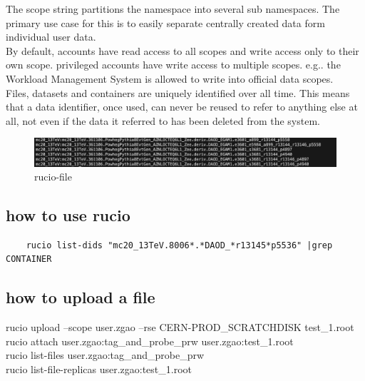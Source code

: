 \documentclass{ctexart}
\begin{document}
The scope string partitions the namespace into several sub namespaces. The primary use case for this is to easily separate centrally created data form individual user data.\\

By default, accounts have read access to all scopes and write access only to their own scope. privileged accounts have write access to multiple scopes. e.g.. the Workload Management System is allowed to write into official data scopes.\\

Files, datasets and containers are uniquely identified over all time. This means that a data identifier, once used, can never be reused to refer to anything else at all, not even if the data it referred to has been deleted from the system.

\begin{figure}[H] %
\centering %
\includegraphics[width=1.0\textwidth]{rucio-file.png} %
\caption{rucio-file} %
\label{rucio-file} %
\end{figure}
\subsection{how to use rucio}

\begin{lstlisting}
    rucio list-dids "mc20_13TeV.8006*.*DAOD_*r13145*p5536" |grep CONTAINER
\end{lstlisting}
\subsection{how to upload a file }
rucio upload --scope user.zgao --rse CERN-PROD\_SCRATCHDISK test\_1.root  \\
rucio attach user.zgao:tag\_and\_probe\_prw user.zgao:test\_1.root \\
rucio list-files user.zgao:tag\_and\_probe\_prw\\
rucio list-file-replicas user.zgao:test\_1.root
\end{document}
